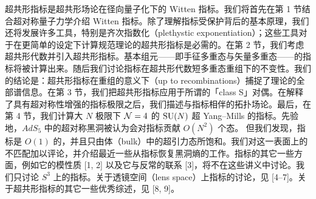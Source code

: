 超共形指标是超共形场论在径向量子化下的 Witten 指标。我们将首先在第 1 节结合超对称量子力学介绍 Witten 指标。除了理解指标受保护背后的基本原理，我们还将发展许多工具，特别是齐次指数化（plethystic exponentiation）；这些工具对于在更简单的设定下计算规范理论的超共形指标是必需的。在第 2 节，我们考虑超共形代数并引入超共形指标。基本组元——即手征多重态与矢量多重态——的指标将被计算出来。随后我们讨论指标在超共形代数短多重态重组下的不变性。我们的结论是：超共形指标在重组的意义下（up to recombinations）捕捉了理论的全部谱信息。在第 3 节，我们把超共形指标应用于所谓的「class S」对偶。在解释了具有超对称性增强的指标极限之后，我们描述与指标相伴的拓扑场论。最后，在第 4 节，我们计算大 $N$ 极限下 $\mathcal{N}=4$ 的 $\operatorname{SU}(N)$ 超 Yang–Mills 的指标。先验地，$AdS_5$ 中的超对称黑洞被认为会对指标贡献 $O(N^2)$ 个态。
但我们发现，指标是 $O(1)$ 的，并且只由体（bulk）中的超引力态所饱和。我们对这一表面上的不匹配加以评论，并介绍最近一些从指标恢复黑洞熵的工作。指标的其它一些方面，例如它的模性质 [1, 2] 以及它与反常的联系 [3]，将不在这些讲义中讨论。我们只讨论 $S^3$ 上的指标。关于透镜空间（lens space）上指标的讨论，见 [4–7]。关于超共形指标的其它一些优秀综述，见 [8, 9]。

